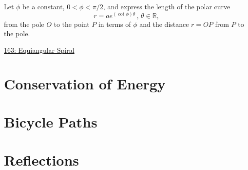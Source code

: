 \documentclass{ximera}
\begin{document}
\begin{question}  \label{Q5434g54t5t}
Let $\phi$ be a constant, $0< \phi < \pi/2$, and express the length of the polar curve
\[
     r = a e^{(\cot \phi) \theta} \, , \, \theta \in \mathbb{R} ,
\]
from the pole $O$ to the point $P$ in terms of $\phi$ and the distance $r=OP$ from $P$ to the pole.

\begin{onlineOnly}
    \begin{center}
\end{center}
\end{onlineOnly}
\href{https://www.desmos.com/calculator/mz10iwmpj3}{163: Equiangular Spiral}


\end{question}



\section*{Conservation of Energy}


\section*{Bicycle Paths}


\section*{Reflections}
\end{document}
